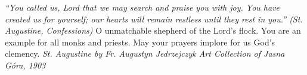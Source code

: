 \pagestyle{empty}
\hspace{0pt}
\vfill

\textit{``You called us, Lord that we may search and praise you
with joy. You have created us for yourself; our hearts will remain
restless until they rest in you.'' (St. Augustine, Confessions)}
\medbreak
O unmatchable shepherd of the Lord's flock. You are an
example for all monks and priests. May your prayers implore for us
God's clemency.
\vfill
\textit{St. Augustine by Fr. Augustyn Jedrzejczyk Art Collection of Jasna
Góra, 1903}
\hspace{0pt}
\newpage
